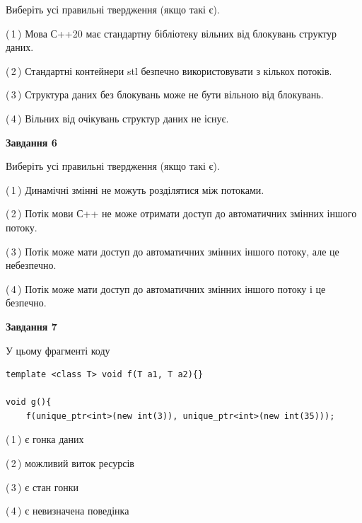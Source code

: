 \documentclass[12pt, ukrainian]{article}
\begin{document}
\begin {large}
{Виберіть усі правильні твердження (якщо такі є).\par
\vspace{2mm}

(\,1\,) Мова С++20 має стандартну бібліотеку вільних від блокувань структур даних.%

(\,2\,) Стандартні контейнери stl безпечно використовувати з кількох потоків.%

(\,3\,) Структура даних без блокувань може не бути вільною від блокувань.%

(\,4\,) Вільних від очікувань структур даних не існує.%
\newpage


\begin{center}
\textbf{Завдання 6}
\end{center}

Виберіть усі правильні твердження (якщо такі є).\par
\vspace{2mm}

(\,1\,) Динамічні змінні не можуть розділятися між потоками.%

(\,2\,) Потік мови С++ не може отримати доступ до автоматичних змінних іншого потоку.%

(\,3\,) Потік може мати доступ до автоматичних змінних іншого потоку, але це небезпечно.%

(\,4\,) Потік може мати доступ до автоматичних змінних іншого потоку і це безпечно.%


\begin{center}
\textbf{Завдання 7}
\end{center}

У цьому фрагменті коду
\begin{verbatim}
template <class T> void f(T a1, T a2){}

void g(){
    f(unique_ptr<int>(new int(3)), unique_ptr<int>(new int(35)));
\end{verbatim}

(\,1\,) є гонка даних%

(\,2\,) можливий виток ресурсів%

(\,3\,) є стан гонки%

(\,4\,) є невизначена поведінка%

}
\end {large}

\vspace{4mm}
\newpage
\end{document}
